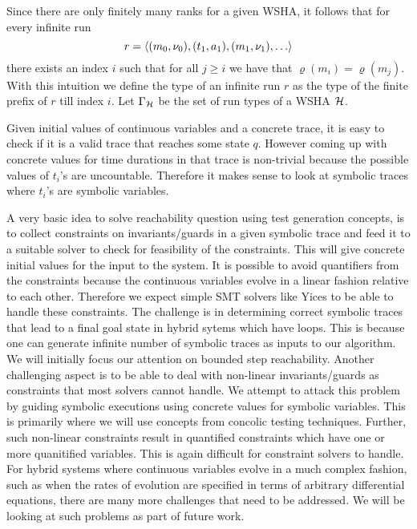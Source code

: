 Since there are only finitely many ranks for a given WSHA, it follows that for
every infinite run 
\[
r = \langle (m_0, \nu_0), (t_1, a_1), (m_1, \nu_1), \ldots \rangle
\] there
exists an index $i$ such that  for all $j \geq i$ we have that $\varrho(m_i) =
\varrho(m_j)$. 
With this intuition we define the type of an infinite run $r$ as the type of the
finite prefix of $r$ till index $i$.
Let $\Gamma_{\mathcal{H}}$ be the set of run types of a WSHA $\mathcal{H}$.

Given initial values of continuous variables and a concrete trace, it is easy to check if it is a valid trace that reaches some state $q$. However coming up with concrete values for time durations in that trace is non-trivial because the possible values of $t_i$'s are uncountable. Therefore it makes sense to look at symbolic traces where $t_i$'s are symbolic variables. 

A very basic idea to solve reachability question using test generation concepts, is to collect constraints on invariants/guards in a given symbolic trace and feed it to a suitable solver to check for feasibility of the constraints. This will give concrete initial values for the input to the system. It is possible to avoid quantifiers from the constraints because the continuous variables evolve in a linear fashion relative to each other. Therefore we expect simple SMT solvers like Yices to be able to handle these constraints. The challenge is in determining correct symbolic traces that lead to a final goal state in hybrid sytems which have loops. This is because one can generate infinite number of symbolic traces as inputs to our algorithm. We will initially focus our attention on bounded step reachability. Another challenging aspect is to be able to deal with non-linear invariants/guards as constraints that most solvers cannot handle. We attempt to attack this problem by guiding symbolic executions using concrete values for symbolic variables. This is primarily where we will use concepts from concolic testing techniques. Further, such non-linear constraints result in quantified constraints which have one or more quanitified variables. This is again difficult for constraint solvers to handle.  
For hybrid systems where continuous variables evolve in a much complex fashion, such as when the rates of evolution are specified in terms of arbitrary differential equations, there are many more challenges that need to be addressed. We will be looking at such problems as part of future work.  
